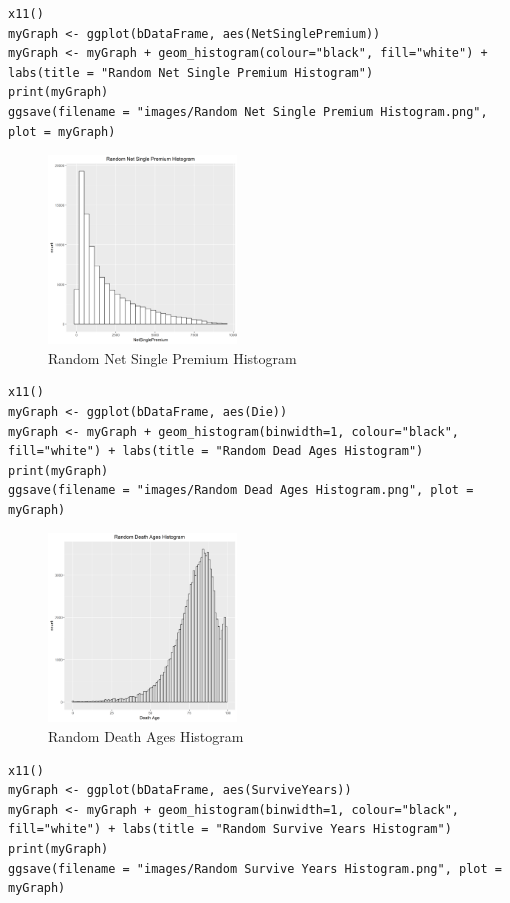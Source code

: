 \documentclass[12pt]{article}
\begin{document}
\begin{lstlisting}[caption={ Random Net Single Premium Histogram},captionpos=b,label={list:L12}]
x11()
myGraph <- ggplot(bDataFrame, aes(NetSinglePremium))
myGraph <- myGraph + geom_histogram(colour="black", fill="white") + labs(title = "Random Net Single Premium Histogram")
print(myGraph)
ggsave(filename = "images/Random Net Single Premium Histogram.png", plot = myGraph)
\end{lstlisting}
\begin{figure}[h]
	\centering
	\includegraphics[width=0.5\linewidth, height=5cm]{S4.png}
	\caption{Random Net Single Premium Histogram }
	
\end{figure}
\pagebreak
\begin{lstlisting}[caption={Random Death Ages Histogram},captionpos=b,label={list:L13}]
x11()
myGraph <- ggplot(bDataFrame, aes(Die))
myGraph <- myGraph + geom_histogram(binwidth=1, colour="black", fill="white") + labs(title = "Random Dead Ages Histogram")
print(myGraph)
ggsave(filename = "images/Random Dead Ages Histogram.png", plot = myGraph)
\end{lstlisting}
\begin{figure}[h]
	\centering
	\includegraphics[width=0.5\linewidth, height=5cm]{S5.png}
	\caption{Random Death Ages Histogram}
	
\end{figure}
\pagebreak
\begin{lstlisting}[caption={Random Survived Years Histogram},captionpos=b,label={list:L14}]
x11()
myGraph <- ggplot(bDataFrame, aes(SurviveYears))
myGraph <- myGraph + geom_histogram(binwidth=1, colour="black", fill="white") + labs(title = "Random Survive Years Histogram")
print(myGraph)
ggsave(filename = "images/Random Survive Years Histogram.png", plot = myGraph)
\end{lstlisting}
\end{document}

